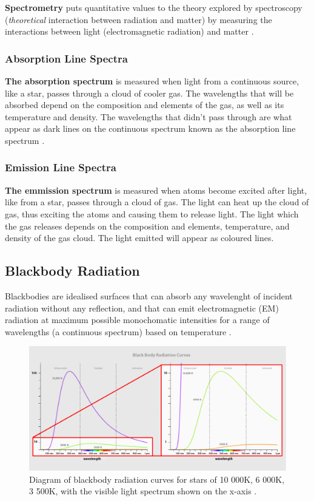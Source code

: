 \documentclass[12pt]{article}
\begin{document}
\textbf{Spectrometry} puts quantitative values to the theory explored by spectroscopy (\textit{theoretical} interaction between radiation and matter) by measuring the interactions between light (electromagnetic radiation)
and matter
\cite{ataspectrosco}.

\subsubsection{Absorption Line Spectra}

\textbf{The absorption spectrum} is measured when light from a continuous source, like a star, passes through a cloud of cooler gas.
The wavelengths that will be absorbed depend on the composition and elements of the gas, as well as its temperature and density. The wavelengths
that didn't pass through are what appear as dark lines on the continuous spectrum known as the absorption line spectrum \cite{cosmosabsorp}.

\subsubsection{Emission Line Spectra}

\textbf{The emmission spectrum} is measured when atoms become excited after light, like from a star, passes through a cloud of gas.
The light can heat up the cloud of gas, thus exciting the atoms and causing them to release light. The light which the gas releases depends on the
composition and elements, temperature, and density of the gas cloud. The light emitted will appear as coloured lines.

\subsection{Blackbody Radiation} \label{sec:1.1}

Blackbodies are idealised surfaces that can absorb any wavelenght of incident radiation without any reflection, and that can emit electromagnetic (EM) radiation
at maximum possible monochomatic intensities for a range of wavelengths (a continuous spectrum) based on temperature
\cite{librablackodyrad,UCDblackbocdyrad,ESAblackbodyrad}.

\begin{figure}[H]
    \centering
    \includegraphics[width=12.5cm]{blackbody.jpg}
    \caption{\centering Diagram of blackbody radiation curves for stars of 10 000K, 6 000K, 3 500K, with the visible light spectrum shown on the x-axis \protect\cite{ESAblackbodyrad}.}
    \label{fig:blackbodyrad}
\end{figure}
\end{document}
